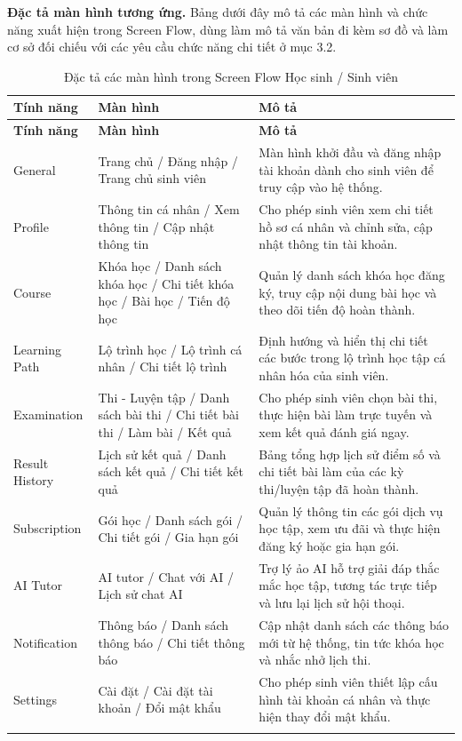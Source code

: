 \documentclass[12pt,a4paper,oneside]{report}
\begin{document}
\noindent\textbf{Đặc tả màn hình tương ứng.} Bảng dưới đây mô tả các màn hình và chức năng xuất hiện trong Screen Flow, dùng làm mô tả văn bản đi kèm sơ đồ và làm cơ sở đối chiếu với các yêu cầu chức năng chi tiết ở mục 3.2.

\renewcommand{\arraystretch}{1.12}
\begin{longtable}{|p{3.0cm}|p{4.1cm}|p{7.0cm}|}
\hline
\rowcolor{orange!15}
\textbf{Tính năng} & \textbf{Màn hình} & \textbf{Mô tả} \\ \hline
\endfirsthead
\hline
\rowcolor{orange!15}
\textbf{Tính năng} & \textbf{Màn hình} & \textbf{Mô tả} \\ \hline
\endhead
General & Trang chủ / Đăng nhập / Trang chủ sinh viên & Màn hình khởi đầu và đăng nhập tài khoản dành cho sinh viên để truy cập vào hệ thống. \\ \hline
Profile & Thông tin cá nhân / Xem thông tin / Cập nhật thông tin & Cho phép sinh viên xem chi tiết hồ sơ cá nhân và chỉnh sửa, cập nhật thông tin tài khoản. \\ \hline
Course & Khóa học / Danh sách khóa học / Chi tiết khóa học / Bài học / Tiến độ học & Quản lý danh sách khóa học đăng ký, truy cập nội dung bài học và theo dõi tiến độ hoàn thành. \\ \hline
Learning Path & Lộ trình học / Lộ trình cá nhân / Chi tiết lộ trình & Định hướng và hiển thị chi tiết các bước trong lộ trình học tập cá nhân hóa của sinh viên. \\ \hline
Examination & Thi - Luyện tập / Danh sách bài thi / Chi tiết bài thi / Làm bài / Kết quả & Cho phép sinh viên chọn bài thi, thực hiện bài làm trực tuyến và xem kết quả đánh giá ngay. \\ \hline
Result History & Lịch sử kết quả / Danh sách kết quả / Chi tiết kết quả & Bảng tổng hợp lịch sử điểm số và chi tiết bài làm của các kỳ thi/luyện tập đã hoàn thành. \\ \hline
Subscription & Gói học / Danh sách gói / Chi tiết gói / Gia hạn gói & Quản lý thông tin các gói dịch vụ học tập, xem ưu đãi và thực hiện đăng ký hoặc gia hạn gói. \\ \hline
AI Tutor & AI tutor / Chat với AI / Lịch sử chat AI & Trợ lý ảo AI hỗ trợ giải đáp thắc mắc học tập, tương tác trực tiếp và lưu lại lịch sử hội thoại. \\ \hline
Notification & Thông báo / Danh sách thông báo / Chi tiết thông báo & Cập nhật danh sách các thông báo mới từ hệ thống, tin tức khóa học và nhắc nhở lịch thi. \\ \hline
Settings & Cài đặt / Cài đặt tài khoản / Đổi mật khẩu & Cho phép sinh viên thiết lập cấu hình tài khoản cá nhân và thực hiện thay đổi mật khẩu. \\ \hline
\caption{Đặc tả các màn hình trong Screen Flow Học sinh / Sinh viên}
\end{longtable}
\clearpage
\end{document}
